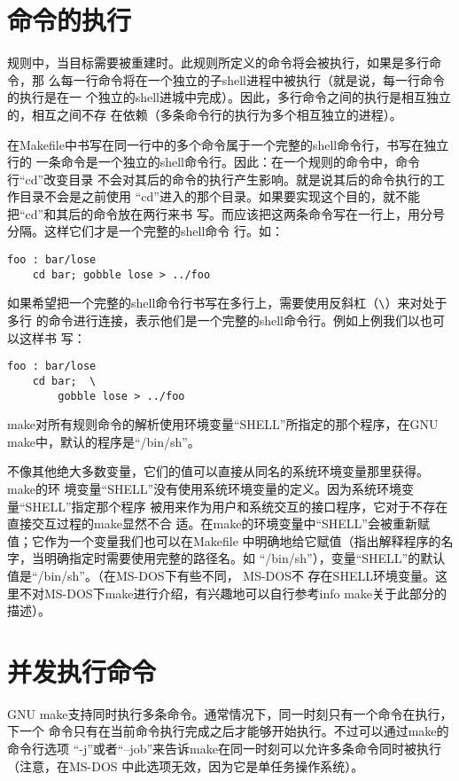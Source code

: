 \section{命令的执行}
规则中，当目标需要被重建时。此规则所定义的命令将会被执行，如果是多行命令，那
么每一行命令将在一个独立的子shell进程中被执行（就是说，每一行命令的执行是在一
个独立的shell进城中完成）。因此，多行命令之间的执行是相互独立的，相互之间不存
在依赖（多条命令行的执行为多个相互独立的进程）。

在Makefile中书写在同一行中的多个命令属于一个完整的shell命令行，书写在独立行的
一条命令是一个独立的shell命令行。因此：在一个规则的命令中，命令行“cd”改变目录
不会对其后的命令的执行产生影响。就是说其后的命令执行的工作目录不会是之前使用
“cd”进入的那个目录。如果要实现这个目的，就不能把“cd”和其后的命令放在两行来书
写。而应该把这两条命令写在一行上，用分号分隔。这样它们才是一个完整的shell命令
行。如：

\begin{Verbatim}[]
foo : bar/lose
    cd bar; gobble lose > ../foo
\end{Verbatim}

如果希望把一个完整的shell命令行书写在多行上，需要使用反斜杠（\verb"\"）来对处于多行
的命令进行连接，表示他们是一个完整的shell命令行。例如上例我们以也可以这样书
写：

\begin{Verbatim}[]
foo : bar/lose
    cd bar;  \
        gobble lose > ../foo
\end{Verbatim}

make对所有规则命令的解析使用环境变量“SHELL”所指定的那个程序，在GNU make中，默认的程序是“/bin/sh”。

不像其他绝大多数变量，它们的值可以直接从同名的系统环境变量那里获得。make的环
境变量“SHELL”没有使用系统环境变量的定义。因为系统环境变量“SHELL”指定那个程序
被用来作为用户和系统交互的接口程序，它对于不存在直接交互过程的make显然不合
适。在make的环境变量中“SHELL”会被重新赋值；它作为一个变量我们也可以在Makefile
中明确地给它赋值（指出解释程序的名字，当明确指定时需要使用完整的路径名。如
“/bin/sh”），变量“SHELL”的默认值是“/bin/sh”。（在MS-DOS下有些不同， MS-DOS不
存在SHELL环境变量。这里不对MS-DOS下make进行介绍，有兴趣地可以自行参考info
make关于此部分的描述）。

\section{并发执行命令}
GNU make支持同时执行多条命令。通常情况下，同一时刻只有一个命令在执行，下一个
命令只有在当前命令执行完成之后才能够开始执行。不过可以通过make的命令行选项
“-j”或者“--job”来告诉make在同一时刻可以允许多条命令同时被执行（注意，在MS-DOS
中此选项无效，因为它是单任务操作系统）。

